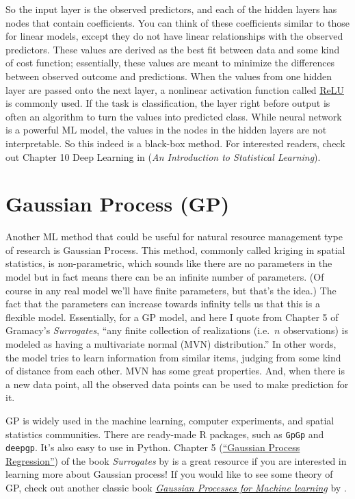 \documentclass[
]{book}
\begin{document}
So the input layer is the observed predictors, and each of the hidden layers has nodes that contain coefficients. You can think of these coefficients similar to those for linear models, except they do not have linear relationships with the observed predictors. These values are derived as the best fit between data and some kind of cost function; essentially, these values are meant to minimize the differences between observed outcome and predictions. When the values from one hidden layer are passed onto the next layer, a nonlinear activation function called \href{https://en.wikipedia.org/wiki/Rectifier_(neural_networks)}{ReLU} is commonly used. If the task is classification, the layer right before output is often an algorithm to turn the values into predicted class. While neural network is a powerful ML model, the values in the nodes in the hidden layers are not interpretable. So this indeed is a black-box method. For interested readers, check out Chapter 10 Deep Learning in \citet{james2013introduction} (\emph{An Introduction to Statistical Learning}).

\hypertarget{gaussian-process-gp}{%
\section{Gaussian Process (GP)}\label{gaussian-process-gp}}

Another ML method that could be useful for natural resource management type of research is Gaussian Process. This method, commonly called kriging in spatial statistics, is non-parametric, which sounds like there are no parameters in the model but in fact means there can be an infinite number of parameters. (Of course in any real model we'll have finite parameters, but that's the idea.) The fact that the parameters can increase towards infinity tells us that this is a flexible model. Essentially, for a GP model, and here I quote from Chapter 5 of Gramacy's \emph{Surrogates}, ``any finite collection of realizations (i.e.~\(n\) observations) is modeled as having a multivariate normal (MVN) distribution.'' In other words, the model tries to learn information from similar items, judging from some kind of distance from each other. MVN has some great properties. And, when there is a new data point, all the observed data points can be used to make prediction for it.

GP is widely used in the machine learning, computer experiments, and spatial statistics communities. There are ready-made R packages, such as \texttt{GpGp} and \texttt{deepgp}. It's also easy to use in Python. Chapter 5 (\href{https://bookdown.org/rbg/surrogates/chap5.html}{``Gaussian Process Regression''}) of the book \emph{Surrogates} by \citet{gramacy2020surrogates} is a great resource if you are interested in learning more about Gaussian process! If you would like to see some theory of GP, check out another classic book \href{https://gaussianprocess.org/gpml/}{\emph{Gaussian Processes for Machine learning}} by \citet{CR2006gp}.
\end{document}
